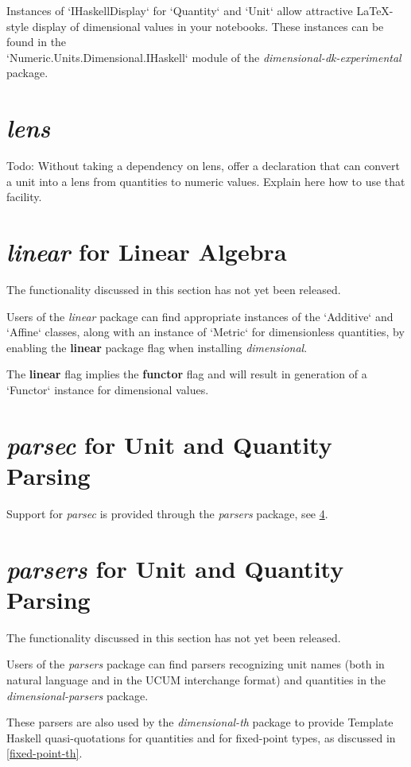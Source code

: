 \documentclass[11pt]{report}
\newcommand{\packagename}[1]{\textit{#1}}
\newcommand{\thispackage}{\packagename{dimensional}}
\newcommand{\experimentalpackage}{\packagename{dimensional-dk-experimental}}
\newcommand{\flag}[1]{\textbf{#1}}
\newcommand{\prerelease}{\begin{framed}
The functionality discussed in this section has not yet been released.
\end{framed}}
\begin{document}
Instances of `IHaskellDisplay` for `Quantity` and `Unit`
allow attractive \LaTeX{}-style display of dimensional values in your notebooks. These
instances can be found in the \\
`Numeric.Units.Dimensional.IHaskell` module of the \experimentalpackage{}
package.

\section{\packagename{lens}}

Todo: Without taking a dependency on lens, offer a declaration that can convert a unit into a lens from quantities to numeric values.
Explain here how to use that facility.

\section{\packagename{linear} for Linear Algebra}

\prerelease{}

Users of the \packagename{linear} package can find appropriate instances of
the `Additive` and `Affine` classes, along with an
instance of `Metric` for dimensionless quantities, by enabling the \flag{linear}
package flag when installing \thispackage{}.

The \flag{linear} flag implies the \flag{functor} flag and will result in generation of a `Functor`
instance for dimensional values.

\section{\packagename{parsec} for Unit and Quantity Parsing}

Support for \packagename{parsec} is provided through the \packagename{parsers} package, see \ref{parsers-support}.

\section{\packagename{parsers} for Unit and Quantity Parsing} \label{parsers-support}

\prerelease{}

Users of the \packagename{parsers} package can find parsers recognizing
unit names (both in natural language and in the UCUM interchange format) and
quantities in the \packagename{dimensional-parsers} package.

These parsers are also used by the \packagename{dimensional-th} package to provide
Template Haskell quasi-quotations for quantities and for fixed-point types, as
discussed in \ref{fixed-point-th}.
\end{document}
